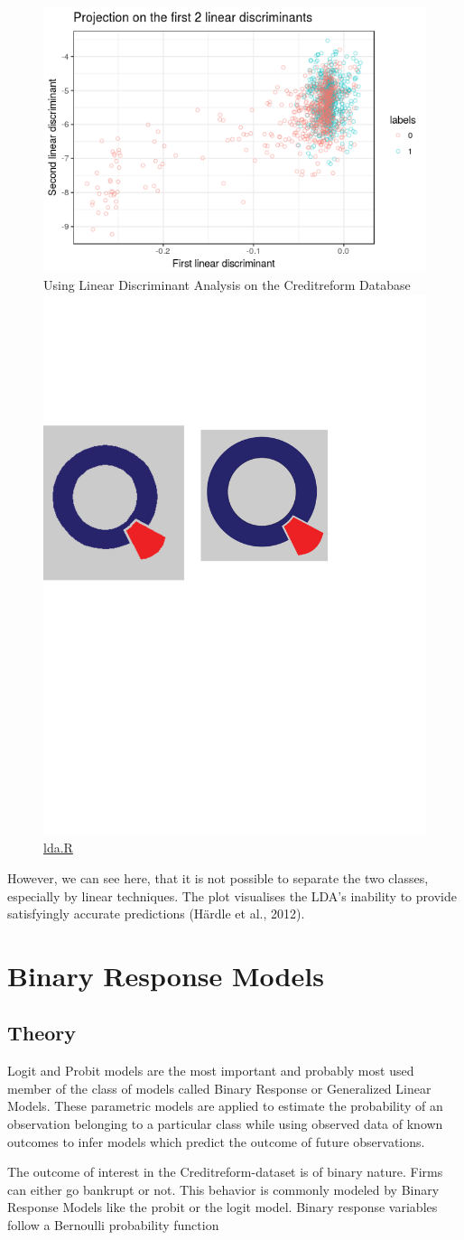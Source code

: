 \documentclass{article}
\newcommand{\bscaption}[2]{\protect\includegraphics[scale=0.05]{qletlogo.pdf} {\href{#1}{#2}}}
\begin{document}
\begin{figure}[b]
\caption{Using Linear Discriminant Analysis on the Creditreform Database \bscaption{https://github.com/thsis/SPL_WS1718/blob/master/LDA/lda.R}{lda.R}}
\centering
\includegraphics[scale=0.5]{../LDA/creditLDA.png}
\end{figure}

However, we can see here, that it is not possible to separate the two classes, especially by linear techniques. The plot visualises the LDA's inability to provide satisfyingly accurate predictions (H{\"a}rdle et al., 2012).


\section{Binary Response Models}
\subsection{Theory}

Logit and Probit models are the most important and probably most used member of the class of models called Binary Response or Generalized Linear Models. These parametric models are applied to estimate the probability of an observation belonging to a particular class while using observed data of known outcomes to infer models which predict the outcome of future observations.

The outcome of interest in the Creditreform-dataset is of binary nature. Firms can either go bankrupt or not. This behavior is commonly modeled by Binary Response Models like the probit or the logit model. Binary response variables follow a Bernoulli probability function
\end{document}
